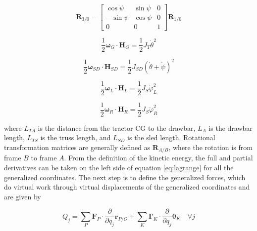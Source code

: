 \begin{linenomath*}
    \begin{equation}
        \mathbf{R}_{3/0} = \begin{bmatrix} \cos\psi & \sin\psi & 0 \\ -\sin\psi & \cos\psi & 0 \\ 0 & 0 & 1 \end{bmatrix}\mathbf{R}_{1/0}
    \end{equation}
\end{linenomath*}
\begin{linenomath*}
    \begin{equation}
        \frac{1}{2}\boldsymbol{\omega}_G\cdot\mathbf{H}_G = \frac{1}{2}J_T\dot\theta^2
    \end{equation}
\end{linenomath*}
\begin{linenomath*}
    \begin{equation}
        \frac{1}{2}\boldsymbol{\omega}_{SD}\cdot\mathbf{H}_{SD} = \frac{1}{2}J_{SD}(\dot\theta + \dot\psi)^2
    \end{equation}
\end{linenomath*}
\begin{linenomath*}
    \begin{equation}
        \frac{1}{2}\boldsymbol{\omega}_L\cdot\mathbf{H}_L = \frac{1}{2}J_S\dot\varphi_L^2
    \end{equation}
\end{linenomath*}
\begin{linenomath*}
    \begin{equation}
        \frac{1}{2}\boldsymbol{\omega}_R\cdot\mathbf{H}_R = \frac{1}{2}J_S\dot\varphi_R^2
    \end{equation}
\end{linenomath*}
where $L_{TA}$ is the distance from the tractor CG to the drawbar, $L_A$ is the drawbar length, $L_{TS}$ is the truss length, and $L_{SD}$ is the sled length. Rotational transformation matrices are generally defined as  $\mathbf{R}_{A/B}$, where the rotation is from frame $B$ to frame $A$. From the definition of the kinetic energy, the full and partial derivatives can be taken on the left side of equation \ref{eq:lagrange} for all the generalized coordinates. The next step is to define the generalized forces, which do virtual work through virtual displacements of the generalized coordinates and are given by
\begin{linenomath*}
    \begin{equation}\label{eq:generalized_forces}
          Q_j = \sum_{P}^{} \mathbf{F}_P\cdot \frac{\partial}{\partial q_j}\mathbf{r}_{P/O}  + \sum_{K}^{} \boldsymbol{\Gamma}_K\cdot\frac{\partial}{\partial q_j}\boldsymbol{\theta}_K  \quad \forall j
    \end{equation}
\end{linenomath*}
